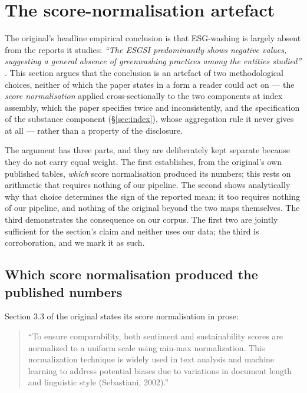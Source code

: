 \section{The score-normalisation artefact}
\label{sec:artefact}

The original's headline empirical conclusion is that ESG-washing is largely
absent from the reports it studies: \emph{``The ESGSI predominantly shows
negative values, suggesting a general absence of greenwashing practices among
the entities studied''} \citep[p.~6]{lagasio2024}. This section argues that the
conclusion is an artefact of two methodological choices, neither of which the
paper states in a form a reader could act on --- the \emph{score normalisation}
applied cross-sectionally to the two components at index assembly, which the paper
specifies twice and inconsistently, and the specification of the substance
component (\S\ref{sec:index}), whose aggregation rule it never gives at all
--- rather than a property of the disclosure.

The argument has three parts, and they are deliberately kept separate because
they do not carry equal weight. The first establishes, from the original's own
published tables, \emph{which} score normalisation produced its numbers; this
rests on arithmetic that requires nothing of our pipeline. The second shows
analytically why that choice determines the sign of the reported mean; it too
requires nothing of our pipeline, and nothing of the original beyond the two
maps themselves. The third demonstrates the consequence on our corpus. The
first two are jointly sufficient for the section's claim and neither uses our
data; the third is corroboration, and we mark it as such.

\subsection{Which score normalisation produced the published numbers}
\label{sec:artefact-which}

Section 3.3 of the original states its score normalisation in prose:

\begin{quote}
``To ensure comparability, both sentiment and sustainability scores are
normalized to a uniform scale using min-max normalization. This normalization
technique is widely used in text analysis and machine learning to address
potential biases due to variations in document length and linguistic style
(Sebastiani, 2002).'' \citep[p.~4]{lagasio2024}
\end{quote}

